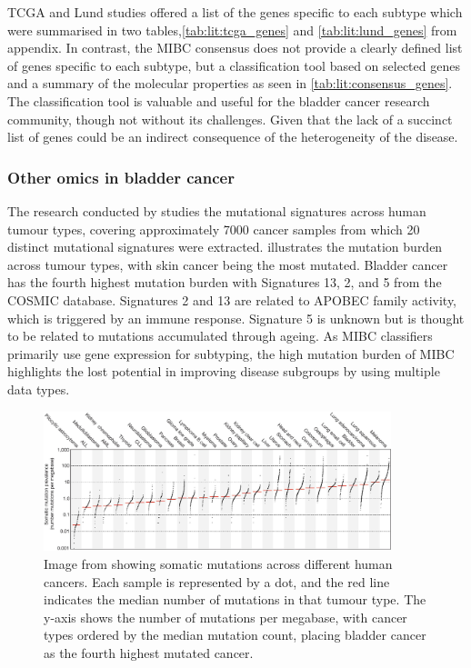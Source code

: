 TCGA and Lund studies offered a list of the genes specific to each subtype which were summarised in two tables,\cref{tab:lit:tcga_genes} and \cref{tab:lit:lund_genes} from appendix. In contrast, the MIBC consensus does not provide a clearly defined list of genes specific to each subtype, but a classification tool based on selected genes and a summary of the molecular properties as seen in \cref{tab:lit:consensus_genes}. The classification tool is valuable and useful for the bladder cancer research community, though not without its challenges. Given that the lack of a succinct list of genes could be an indirect consequence of the heterogeneity of the disease.

\subsubsection{Other omics in bladder cancer}

The research conducted by \citet{Alexandrov2013-gi} studies the mutational signatures across human tumour types, covering approximately 7000 cancer samples from which 20 distinct mutational signatures were extracted.  illustrates the mutation burden across tumour types, with skin cancer being the most mutated. Bladder cancer has the fourth highest mutation burden with Signatures 13, 2, and 5 from the COSMIC database\cite{Tate2019-yj}. Signatures 2 and 13 are related to APOBEC family activity, which is triggered by an immune response. Signature 5 is unknown but is thought to be related to mutations accumulated through ageing. As MIBC classifiers primarily use gene expression for subtyping, the high mutation burden of MIBC highlights the lost potential in improving disease subgroups by using multiple data types.

\begin{figure}[!b]    
    \centering
\includegraphics[width=0.9\textwidth,height=0.9\textheight,keepaspectratio]{Sections/Lit_review/Resources/mut_sig_cancers.jpg}
    \caption{Image from \cite{Alexandrov2013-gi} showing somatic mutations across different human cancers. Each sample is represented by a dot, and the red line indicates the median number of mutations in that tumour type. The y-axis shows the number of mutations per megabase, with cancer types ordered by the median mutation count, placing bladder cancer as the fourth highest mutated cancer.}
    \label{fig:lit:cancer_mut_sig}
\end{figure}


